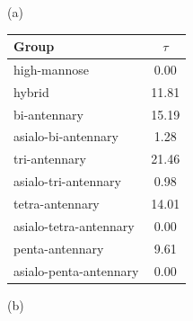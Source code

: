     \begin{table}
        \begin{minipage}[t]{0.25\linewidth}
            \vspace{0pt}
            (a)
            \centering
            
    \begin{tabular}{l | c}
        Group & $\tau$ \\
        \hline
        high-mannose & 0.00 \\
        hybrid & 11.81 \\
        bi-antennary & 15.19 \\
        asialo-bi-antennary & 1.28 \\
        tri-antennary & 21.46 \\
        asialo-tri-antennary & 0.98 \\
        tetra-antennary & 14.01 \\
        asialo-tetra-antennary & 0.00 \\
        penta-antennary & 9.61 \\
        asialo-penta-antennary & 0.00 \\
    \end{tabular}
    
            
        \end{minipage}
        \hspace{1cm}
        \begin{minipage}[t]{0.55\linewidth}
            \vspace{0pt}
            (b)
            \centering
            

\end{minipage}
\end{table}
